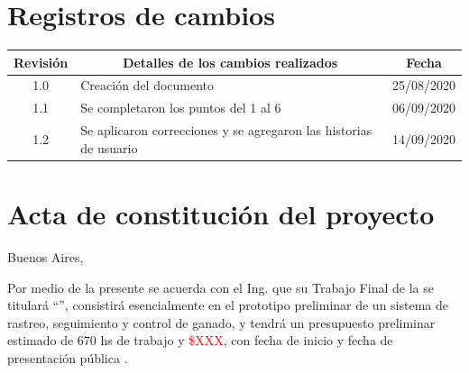 \documentclass[11pt]{charter}
\begin{document}
\maketitle
\thispagestyle{empty}
\pagebreak


\thispagestyle{empty}
{\setlength{\parskip}{0pt}
\tableofcontents{}
}
\pagebreak


\section{Registros de cambios}
\label{sec:registro}


\begin{table}[ht]
\label{tab:registro}
\centering
\begin{tabularx}{\linewidth}{@{}|c|X|c|@{}}
\hline
\rowcolor[HTML]{C0C0C0} 
Revisión & \multicolumn{1}{c|}{\cellcolor[HTML]{C0C0C0}Detalles de los cambios realizados} & Fecha      \\ \hline
1.0      & Creación del documento                                          & 25/08/2020 \\ \hline
1.1      & Se completaron los puntos del 1 al 6                                                                 & 06/09/2020 \\ \hline
1.2      & Se aplicaron correcciones y se agregaron las historias de usuario                                                 & 14/09/2020 \\ \hline
\end{tabularx}
\end{table}

\pagebreak



\section{Acta de constitución del proyecto}
\label{sec:acta}

\begin{flushright}
Buenos Aires, \fechaInicioName
\end{flushright}

\vspace{2cm}

Por medio de la presente se acuerda con el Ing. \authorname\hspace{1px} que su Trabajo Final de la \degreename\hspace{1px} se titulará ``\ttitle'', consistirá esencialmente en el prototipo preliminar de un sistema de rastreo, seguimiento y control de ganado, y tendrá un presupuesto preliminar estimado de 670 hs de trabajo y \textcolor{red}{\$XXX}, con fecha de inicio \fechaInicioName\hspace{1px} y fecha de presentación pública \fechaFinalName.
\end{document}
